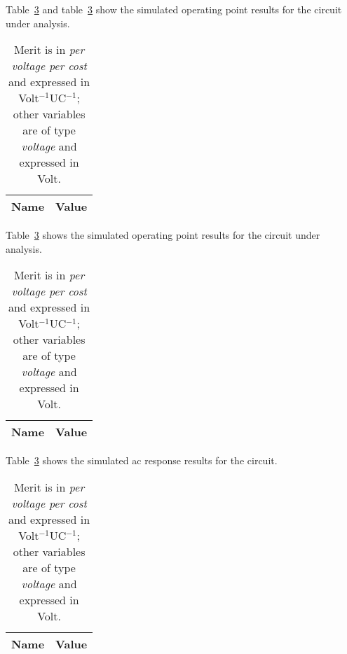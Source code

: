 Table~\ref{tab:SIM_RES} and table~\ref{tab:SIM_RES} show the simulated operating point results for the circuit under analysis.
\begin{table}[h]
  \centering
  \begin{tabular}{|l|r|}
    \hline    
    {\bf Name} & {\bf Value} \\ \hline
    
  \end{tabular}
  \caption{Merit is in {\it per voltage per cost} and expressed in Volt$^{-1}$UC$^{-1}$; other variables are of type {\it voltage} and expressed in Volt.}
  \label{tab:SIM_ZIN}
\end{table}

Table~\ref{tab:SIM_RES} shows the simulated operating point results for the circuit under analysis.
\begin{table}[h]
  \centering
  \begin{tabular}{|l|r|}
    \hline    
    {\bf Name} & {\bf Value} \\ \hline
    
  \end{tabular}
  \caption{Merit is in {\it per voltage per cost} and expressed in Volt$^{-1}$UC$^{-1}$; other variables are of type {\it voltage} and expressed in Volt.}
  \label{tab:SIM_ZOUT_RES}
\end{table}

Table~\ref{tab:SIM_RES} shows the simulated ac response results for the circuit.
\begin{table}[h]
  \centering
  \begin{tabular}{|l|r|}
    \hline    
    {\bf Name} & {\bf Value} \\ \hline
    
  \end{tabular}
  \caption{Merit is in {\it per voltage per cost} and expressed in Volt$^{-1}$UC$^{-1}$; other variables are of type {\it voltage} and expressed in Volt.}
  \label{tab:SIM_RES}
\end{table}
